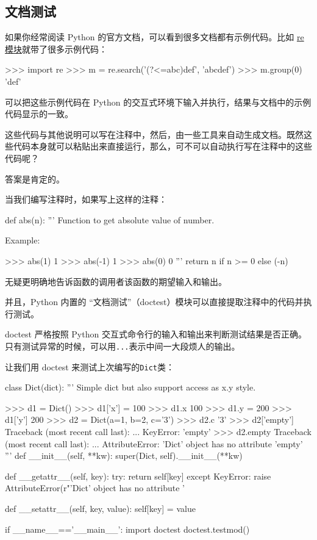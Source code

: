 \hypertarget{ux6587ux6863ux6d4bux8bd5}{%
\subsection{文档测试}\label{ux6587ux6863ux6d4bux8bd5}}

如果你经常阅读 Python 的官方文档，可以看到很多文档都有示例代码。比如
\href{https://docs.python.org/3/library/re.html}{re
模块}就带了很多示例代码：

\begin{pythoncode}
>>> import re
>>> m = re.search('(?<=abc)def', 'abcdef')
>>> m.group(0)
'def'
\end{pythoncode}

可以把这些示例代码在 Python
的交互式环境下输入并执行，结果与文档中的示例代码显示的一致。

这些代码与其他说明可以写在注释中，然后，由一些工具来自动生成文档。既然这些代码本身就可以粘贴出来直接运行，那么，可不可以自动执行写在注释中的这些代码呢？

答案是肯定的。

当我们编写注释时，如果写上这样的注释：

\begin{pythoncode}
def abs(n):
    '''
    Function to get absolute value of number.
    
    Example:
    
    >>> abs(1)
    1
    >>> abs(-1)
    1
    >>> abs(0)
    0
    '''
    return n if n >= 0 else (-n)
\end{pythoncode}

无疑更明确地告诉函数的调用者该函数的期望输入和输出。

并且，Python 内置的
``文档测试''（doctest）模块可以直接提取注释中的代码并执行测试。

doctest 严格按照 Python
交互式命令行的输入和输出来判断测试结果是否正确。只有测试异常的时候，可以用\texttt{...}表示中间一大段烦人的输出。

让我们用 doctest 来测试上次编写的\texttt{Dict}类：

\begin{pythoncode}
class Dict(dict):
    '''
    Simple dict but also support access as x.y style.

    >>> d1 = Dict()
    >>> d1['x'] = 100
    >>> d1.x
    100
    >>> d1.y = 200
    >>> d1['y']
    200
    >>> d2 = Dict(a=1, b=2, c='3')
    >>> d2.c
    '3'
    >>> d2['empty']
    Traceback (most recent call last):
        ...
    KeyError: 'empty'
    >>> d2.empty
    Traceback (most recent call last):
        ...
    AttributeError: 'Dict' object has no attribute 'empty'
    '''
    def __init__(self, **kw):
        super(Dict, self).__init__(**kw)

    def __getattr__(self, key):
        try:
            return self[key]
        except KeyError:
            raise AttributeError(r"'Dict' object has no attribute '%

    def __setattr__(self, key, value):
        self[key] = value

if __name__=='__main__':
    import doctest
    doctest.testmod()
\end{pythoncode}

